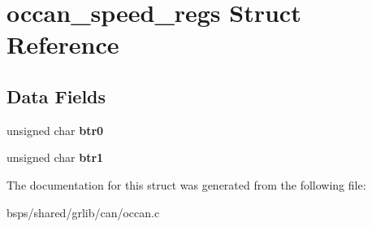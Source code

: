 \hypertarget{structoccan__speed__regs}{}\section{occan\+\_\+speed\+\_\+regs Struct Reference}
\label{structoccan__speed__regs}
\subsection*{Data Fields}
\begin{DoxyCompactItemize}
\item 
\mbox{\label{structoccan__speed__regs_ab95c3995a1fc4ef6699491b4de41b40a}} 
unsigned char {\bfseries btr0}
\item 
\mbox{\label{structoccan__speed__regs_a8f8e055381ffdb0cc66150e204f341bf}} 
unsigned char {\bfseries btr1}
\end{DoxyCompactItemize}


The documentation for this struct was generated from the following file\+:\begin{DoxyCompactItemize}
\item 
bsps/shared/grlib/can/occan.\+c\end{DoxyCompactItemize}

